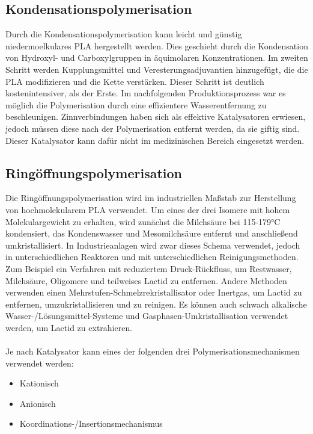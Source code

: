 \documentclass[10pt]{article}
\begin{document}
    \subsection{Kondensationspolymerisation}
    Durch die Kondensationspolymerisation kann leicht und günstig niedermoelkulares PLA hergestellt werden.
    Dies geschieht durch die Kondensation von Hydroxyl- und Carboxylgruppen in äquimolaren Konzentrationen.
    Im zweiten Schritt werden Kupplungsmittel und Veresterungsadjuvantien hinzugefügt, die die PLA modifizieren und die Kette verstärken.
    Dieser Schritt ist deutlich kostenintensiver, als der Erste.
    Im nachfolgenden Produktionsprozess war es möglich die Polymerisation durch eine effizientere Wasserentfernung zu beschleunigen.
    Zinnverbindungen haben sich als effektive Katalysatoren erwiesen, jedoch müssen diese nach der Polymerisation entfernt werden, da sie giftig sind.
    Dieser Katalysator kann dafür nicht im medizinischen Bereich eingesetzt werden.

    \subsection{Ringöffnungspolymerisation}
    Die Ringöffnungspolymerisation wird im industriellen Maßstab zur Herstellung von hochmolekularem PLA verwendet.
    Um eines der drei Isomere mit hohem Molekulargewicht zu erhalten, wird zunächst die Milchsäure bei 115-179°C kondensiert, das Kondenswasser und Mesomilchsäure entfernt und anschließend umkristallisiert.
    In Industrieanlagen wird zwar dieses Schema verwendet, jedoch in unterschiedlichen Reaktoren und mit unterschiedlichen Reinigungsmethoden.
    Zum Beispiel ein Verfahren mit reduziertem Druck-Rückfluss, um Restwasser, Milchsäure, Oligomere und teilweises Lactid zu entfernen.
    Andere Methoden verwenden einen Mehrstufen-Schmelzrekristallisator oder Inertgas, um Lactid zu entfernen, umzukristallisieren und zu reinigen.
    Es können auch schwach alkalische Wasser-/Lösungsmittel-Systeme und Gasphasen-Umkristallisation verwendet werden, um Lactid zu extrahieren. \\ \\

    Je nach Katalysator kann eines der folgenden drei Polymerisationsmechanismen verwendet werden:

    \begin{itemize}
        \item Kationisch
        \item Anionisch
        \item Koordinations-/Insertionsmechanismus
    \end{itemize}
\end{document}
